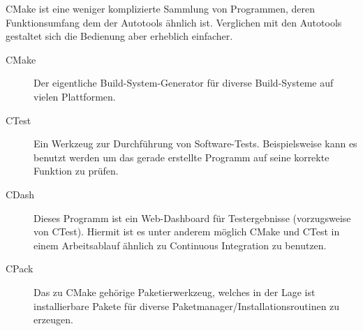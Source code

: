 CMake  ist eine weniger komplizierte Sammlung
von Programmen, deren Funktionsumfang dem der Autotools ähnlich ist.
%
Verglichen mit den Autotools gestaltet sich die Bedienung aber erheblich
einfacher.

\begin{description}
	\item[CMake] Der eigentliche Build-System-Generator für diverse
	Build-Systeme auf vielen Plattformen.
	\item[CTest] Ein Werkzeug zur Durchführung von Software-Tests.
	Beispielsweise kann es benutzt werden um das gerade erstellte Programm auf
	seine korrekte Funktion zu prüfen.
	\item[CDash] Dieses Programm ist ein Web-Dashboard für Testergebnisse
	(vorzugsweise von CTest). Hiermit ist es unter anderem möglich CMake und
	CTest in einem Arbeitsablauf ähnlich zu Continuous Integration zu benutzen.
	\item[CPack] Das zu CMake gehörige Paketierwerkzeug, welches in der Lage ist
	installierbare Pakete für diverse Paketmanager/Installationsroutinen zu
	erzeugen.
\end{description}
